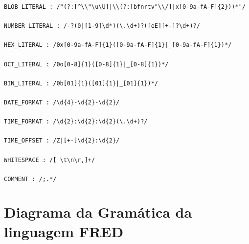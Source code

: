 \begin{apendicesenv}
\begin{lstlisting}[caption=Gramática em notação LARK para linguagem FRED,label={lst:fredgrammar}]
BLOB_LITERAL : /"(?:[^\\"\u\U]|\\(?:[bfnrtv"\\/]|x[0-9a-fA-F]{2}))*"/

NUMBER_LITERAL : /-?(0|[1-9]\d*)(\.\d+)?([eE][+-]?\d+)?/

HEX_LITERAL : /0x[0-9a-fA-F]{1}([0-9a-fA-F]{1}|_[0-9a-fA-F]{1})*/

OCT_LITERAL : /0o[0-8]{1}([0-8]{1}|_[0-8]{1})*/

BIN_LITERAL : /0b[01]{1}([01]{1}|_[01]{1})*/

DATE_FORMAT : /\d{4}-\d{2}-\d{2}/

TIME_FORMAT : /\d{2}:\d{2}:\d{2}(\.\d+)?/

TIME_OFFSET : /Z|[+-]\d{2}:\d{2}/

WHITESPACE : /[ \t\n\r,]+/

COMMENT : /;.*/
\end{lstlisting}

\chapter{Diagrama da Gramática da linguagem FRED}
\label{sec:fredtrain}


\end{apendicesenv}
